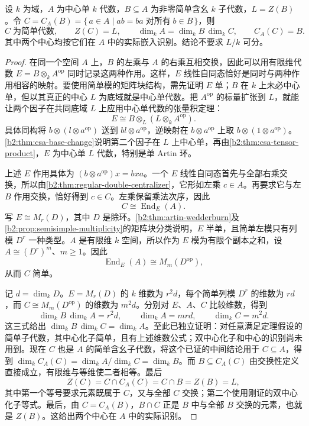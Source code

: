 \begin{theorem}[中心化子定理]\label{b2:thm:csa-centralizer}
	设 \(k\) 为域，\(A\) 为中心单 \(k\) 代数，\(B\subseteq A\) 为非零简单含幺 \(k\) 子代数，\(L=Z(B)\)。令 \(C=C_A(B)=\{\,a\in A\mid ab=ba\;\text{对所有}\;b\in B\,\}\)，则
	\[
		C\;\text{为简单代数},\qquad Z(C)=L, \qquad \dim_kA=\dim_kB\,\dim_kC, \qquad C_A(C)=B.
	\]
	其中两个中心均按它们在 \(A\) 中的实际嵌入识别。结论不要求 \(L/k\) 可分。
\end{theorem}
\begin{proof}
	在同一个空间 \(A\) 上，\(B\) 的左乘与 \(A\) 的右乘互相交换，因此可以用有限维代数 \(E=B\otimes_kA^{\mathrm{op}}\) 同时记录这两种作用。这样，\(E\) 线性自同态恰好是同时与两种作用相容的映射。要使用简单模的矩阵块结构，需先证明 \(E\) 单；\(B\) 在 \(k\) 上未必中心单，但以其真正的中心 \(L\) 为底域就是中心单代数。把 \(A^{\mathrm{op}}\) 的标量扩张到 \(L\)，就能让两个因子在共同底域 \(L\) 上应用中心单代数的张量积定理：
	\[
		E\cong B\otimes_L(L\otimes_kA^{\mathrm{op}}).
	\]
	具体同构将 \(b\otimes(l\otimes a^{\mathrm{op}})\) 送到 \(bl\otimes a^{\mathrm{op}}\)，逆映射在 \(b\otimes a^{\mathrm{op}}\) 上取 \(b\otimes(1\otimes a^{\mathrm{op}})\)。\cref{b2:thm:csa-base-change}说明第二个因子在 \(L\) 上中心单，再由\cref{b2:thm:csa-tensor-product}，\(E\) 为中心单 \(L\) 代数，特别是单 Artin 环。

	上述 \(E\) 作用具体为 \((b\otimes a^{\mathrm{op}})x=bxa\)。一个 \(E\) 线性自同态首先与全部右乘交换，所以由\cref{b2:thm:regular-double-centralizer}，它形如左乘 \(c\in A\)。再要求它与左 \(B\) 作用交换，恰好得到 \(c\in C\)。左乘保留乘法次序，因此
	\[
		C\cong\operatorname{End}_E(A).
	\]
	写 \(E\cong M_r(D)\)，其中 \(D\) 是除环。\cref{b2:thm:artin-wedderburn}及\cref{b2:prop:semisimple-multiplicity}的矩阵块分类说明，\(E\) 半单，且简单左模只有列模 \(D^r\) 一种类型。\(A\) 是有限维 \(k\) 空间，所以作为 \(E\) 模为有限个副本之和，设 \(A\cong(D^r)^m\)、\(m\ge1\)。因此
	\[
		\operatorname{End}_E(A)\cong M_m(D^{\mathrm{op}}),
	\]
	从而 \(C\) 简单。

	记 \(d=\dim_kD\)。\(E=M_r(D)\) 的 \(k\) 维数为 \(r^2d\)，每个简单列模 \(D^r\) 的维数为 \(rd\)，而 \(C\cong M_m(D^{\mathrm{op}})\) 的维数为 \(m^2d\)。分别对 \(E\)、\(A\)、\(C\) 比较维数，得到
	\[
		\dim_kB\,\dim_kA=r^2d,\qquad \dim_kA=mrd,\qquad\dim_kC=m^2d.
	\]
	这三式给出 \(\dim_kB\,\dim_kC=\dim_kA\)。至此已独立证明：对任意满足定理假设的简单子代数，其中心化子简单，且有上述维数公式；双中心化子和中心的识别尚未用到。现在 \(C\) 也是 \(A\) 的简单含幺子代数，将这个已证的中间结论用于 \(C\subseteq A\)，得到 \(\dim_k C_A(C)=\dim_kA/\dim_kC=\dim_kB\)。而 \(B\subseteq C_A(C)\) 由交换性定义直接成立，有限维与等维使二者相等。最后
	\[
		Z(C)=C\cap C_A(C)=C\cap B=Z(B)=L,
	\]
	其中第一个等号要求元素既属于 \(C\)，又与全部 \(C\) 交换；第二个使用刚证的双中心化子等式。最后，由 \(C=C_A(B)\)，\(B\cap C\) 正是 \(B\) 中与全部 \(B\) 交换的元素，也就是 \(Z(B)\)。这给出两个中心在 \(A\) 中的实际识别。
\end{proof}

